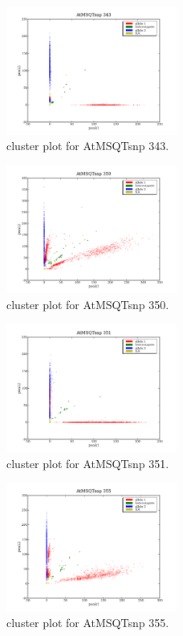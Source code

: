 \begin{figure}[H]
\includegraphics[width=0.5\textwidth]{figures/cluster_plot_AtMSQTsnp_343.png}
\caption{cluster plot for AtMSQTsnp 343.} \label{flAtMSQTsnp343}
\end{figure}

\begin{figure}[H]
\includegraphics[width=0.5\textwidth]{figures/cluster_plot_AtMSQTsnp_350.png}
\caption{cluster plot for AtMSQTsnp 350.} \label{flAtMSQTsnp350}
\end{figure}

\begin{figure}[H]
\includegraphics[width=0.5\textwidth]{figures/cluster_plot_AtMSQTsnp_351.png}
\caption{cluster plot for AtMSQTsnp 351.} \label{flAtMSQTsnp351}
\end{figure}

\begin{figure}[H]
\includegraphics[width=0.5\textwidth]{figures/cluster_plot_AtMSQTsnp_355.png}
\caption{cluster plot for AtMSQTsnp 355.} \label{flAtMSQTsnp355}
\end{figure}

